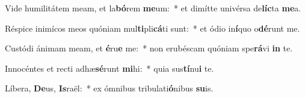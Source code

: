 \item Vide humilitátem meam, et la\textbf{bó}rem \textbf{me}um:~* et dimítte univérsa de\textbf{líc}ta \textbf{me}a.
\item Réspice inimícos meos quóniam mul\textbf{ti}pli\textbf{cá}ti sunt:~* et ódio in\textbf{í}quo o\textbf{dé}runt me.
\item Custódi ánimam meam, et \textbf{é}ru\textbf{e} me:~* non erubéscam quóniam spe\textbf{rá}vi \textbf{in} te.
\item Innocéntes et recti adhæ\textbf{sé}runt \textbf{mi}hi:~* quia sus\textbf{tí}nu\textbf{i} te.
\item Líbera, \textbf{De}us, \textbf{Is}raël:~* ex ómnibus tribulati\textbf{ó}nibus \textbf{su}is.
